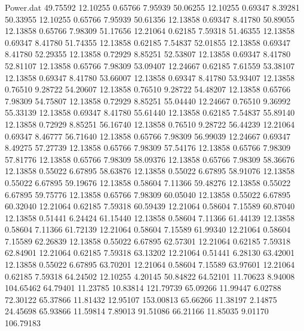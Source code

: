 \begin{filecontents}{Power.dat}
  49.75592   12.10255    0.65766    7.95939
  50.06255   12.10255    0.69347    8.39281
  50.33955   12.10255    0.65766    7.95939
  50.61356   12.13858    0.69347    8.41780
  50.89055   12.13858    0.65766    7.98309
  51.17656   12.21064    0.62185    7.59318
  51.46355   12.13858    0.69347    8.41780
  51.74355   12.13858    0.62185    7.54837
  52.01855   12.13858    0.69347    8.41780
  52.29355   12.13858    0.72929    8.85251
  52.53807   12.13858    0.69347    8.41780
  52.81107   12.13858    0.65766    7.98309
  53.09407   12.24667    0.62185    7.61559
  53.38107   12.13858    0.69347    8.41780
  53.66007   12.13858    0.69347    8.41780
  53.93407   12.13858    0.76510    9.28722
  54.20607   12.13858    0.76510    9.28722
  54.48207   12.13858    0.65766    7.98309
  54.75807   12.13858    0.72929    8.85251
  55.04440   12.24667    0.76510    9.36992
  55.33139   12.13858    0.69347    8.41780
  55.61440   12.13858    0.62185    7.54837
  55.89140   12.13858    0.72929    8.85251
  56.16740   12.13858    0.76510    9.28722
  56.44239   12.21064    0.69347    8.46777
  56.71640   12.13858    0.65766    7.98309
  56.99039   12.24667    0.69347    8.49275
  57.27739   12.13858    0.65766    7.98309
  57.54176   12.13858    0.65766    7.98309
  57.81776   12.13858    0.65766    7.98309
  58.09376   12.13858    0.65766    7.98309
  58.36676   12.13858    0.55022    6.67895
  58.63876   12.13858    0.55022    6.67895
  58.91076   12.13858    0.55022    6.67895
  59.19676   12.13858    0.58604    7.11366
  59.48276   12.13858    0.55022    6.67895
  59.75776   12.13858    0.65766    7.98309
  60.05040   12.13858    0.55022    6.67895
  60.32040   12.21064    0.62185    7.59318
  60.59439   12.21064    0.58604    7.15589
  60.87040   12.13858    0.51441    6.24424
  61.15440   12.13858    0.58604    7.11366
  61.44139   12.13858    0.58604    7.11366
  61.72139   12.21064    0.58604    7.15589
  61.99340   12.21064    0.58604    7.15589
  62.26839   12.13858    0.55022    6.67895
  62.57301   12.21064    0.62185    7.59318
  62.84901   12.21064    0.62185    7.59318
  63.13202   12.21064    0.51441    6.28130
  63.42001   12.13858    0.55022    6.67895
  63.70201   12.21064    0.58604    7.15589
  63.97601   12.21064    0.62185    7.59318
  64.24502   12.10255    4.20145   50.84822
  64.52101   11.70623    8.94008  104.65462
  64.79401   11.23785   10.83814  121.79739
  65.09266   11.99447    6.02788   72.30122
  65.37866   11.81432   12.95107  153.00813
  65.66266   11.38197    2.14875   24.45698
  65.93866   11.59814    7.89013   91.51086
  66.21166   11.85035    9.01170  106.79183

\end{filecontents}
